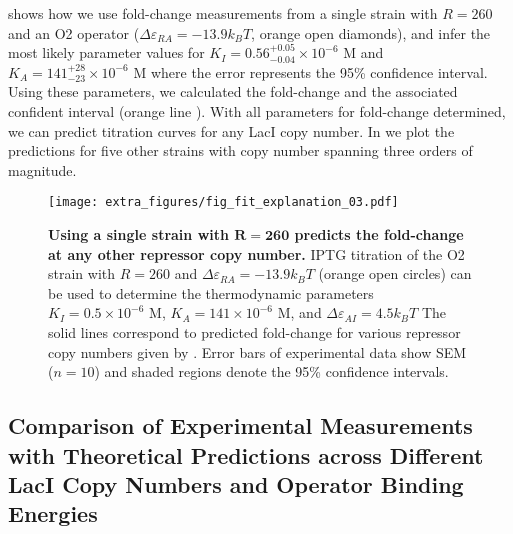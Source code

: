  shows how we use fold-change measurements from a single
strain with $R=260$ and an O2 operator ($\Delta\varepsilon_{RA}=-13.9k_BT$,
orange open diamonds), and infer the most likely parameter values for
$K_I=0.56^{+0.05}_{-0.04} \times 10^{-6}\,\, \text{M}$ and $K_A=141^{+28}_{-23}
\times 10^{-6} \,\, \text{M}$  where the
error represents the 95\% confidence interval. Using these parameters, we
calculated the fold-change \eref[eq7] and the associated confident interval
(orange line ). With all parameters for fold-change
determined, we can predict titration curves for any LacI copy number. In
 we plot the predictions for five other strains  with copy
number spanning three orders of magnitude.

\begin{figure}[h]
	\centering
	\texttt{[image: extra\_figures/fig\_fit\_explanation\_03.pdf]}
	\caption{{\bf Using a single strain with $\boldsymbol{R=260}$ predicts the
			fold-change at any other repressor copy number. } IPTG titration of the O2 strain with $R=260$ and
		$\Delta\varepsilon_{RA} = -13.9k_BT$ (orange open circles) can be used to
		determine the thermodynamic parameters $K_I=0.5 \times 10^{-6} \,\, \text{M}$,
		$K_A=141 \times 10^{-6} \,\, \text{M}$, and $\Delta \varepsilon_{AI}=4.5k_BT$
		The solid lines correspond to predicted fold-change for various repressor copy numbers given
		by \eref[eq7]. Error bars of experimental data show SEM ($n=10$) and shaded
		regions  denote the 95\% confidence intervals.  } \label{fig_result1}
\end{figure}

\subsection*{Comparison of Experimental Measurements with Theoretical Predictions across Different LacI Copy Numbers and Operator Binding Energies}


